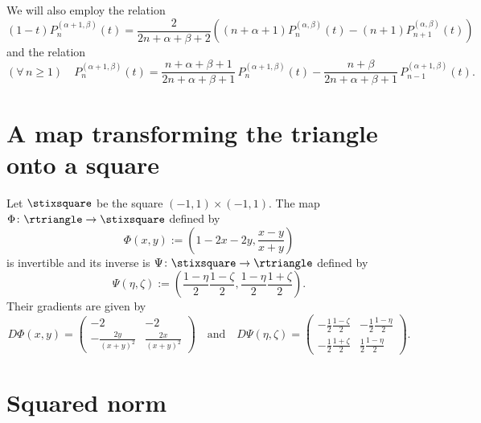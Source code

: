 \documentclass{article}
\numberwithin{equation}{section}
\numberwithin{figure}{section}
\begin{document}
%
We will also employ the relation \cite[Eq.~(4.5.4)]{Szego:1975}
%
\begin{equation}\label{JacobiTimesOneMinusArgShift}
(1-t) P^{(\alpha+1,\beta)}_n(t) = \frac{2}{2n+\alpha+\beta+2} \left( (n+\alpha+1) P^{(\alpha,\beta)}_n(t) - (n+1) P^{(\alpha,\beta)}_{n+1}(t) \right)
\end{equation}
%
and the relation \cite[Eq.~(6.4.21)]{AAR:1999}
%
\begin{equation}\label{JacobiAlphaIdShift}
(\forall\,n\geq 1) \quad P^{(\alpha+1,\beta)}_n(t) = \frac{n+\alpha+\beta+1}{2n+\alpha+\beta+1} \, P^{(\alpha+1,\beta)}_n(t) - \frac{n+\beta}{2n+\alpha+\beta+1} \, P^{(\alpha+1,\beta)}_{n-1}(t).
\end{equation}

\section{A map transforming the triangle onto a square}

Let $\stixsquare$ be the square $(-1,1) \times (-1,1)$.
The map $\Phi \colon \rtriangle \to \stixsquare$ defined by
%
\begin{equation}\label{Phi}
\Phi(x,y) := \left( 1-2x-2y, \frac{x-y}{x+y} \right)
\end{equation}
%
is invertible and its inverse is $\Psi \colon \stixsquare \to \rtriangle$ defined by
%
\begin{equation}\label{Psi}
\Psi(\eta,\zeta) := \left( \frac{1-\eta}{2} \frac{1-\zeta}{2}, \frac{1-\eta}{2} \frac{1+\zeta}{2} \right).
\end{equation}
%
Their gradients are given by
%
\begin{equation*}
D\Phi(x,y) = \begin{pmatrix} -2 & -2 \\ -\frac{2y}{(x+y)^2} & \frac{2x}{(x+y)^2} \end{pmatrix}
\quad\text{and}\quad
D\Psi(\eta,\zeta) = \begin{pmatrix} -\frac{1}{2} \frac{1-\zeta}{2} & -\frac{1}{2} \frac{1-\eta}{2} \\ -\frac{1}{2} \frac{1+\zeta}{2} & \frac{1}{2} \frac{1-\eta}{2} \end{pmatrix}.
\end{equation*}
%

\section{Squared norm}
\end{document}
